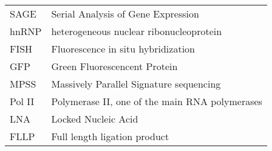 \begin{table}[h]
\begin{tabular}{l|l}
  SAGE     & Serial Analysis of Gene Expression                   \\
  hnRNP    & heterogeneous nuclear ribonucleoprotein              \\
  FISH     & Fluorescence in situ hybridization                   \\
  GFP      & Green Fluorescencent Protein                         \\
  MPSS     & Massively Parallel Signature sequencing              \\
  Pol II   & Polymerase II, one of the main RNA polymerases       \\
  LNA      & Locked Nucleic Acid                                  \\
  FLLP     & Full length ligation product                         \\
  \end{tabular}
  \end{table}
\clearpage